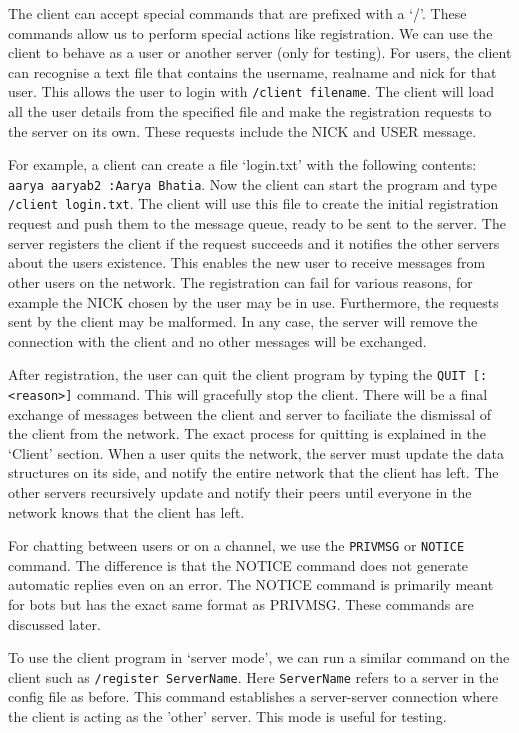\documentclass[letterpaper,twocolumn,10pt]{article}
\begin{document}
The client can accept special commands that are prefixed with a `/'. These
commands allow us to perform special actions like registration. We can use the
client to behave as a user or another server (only for testing). For users, the
client can recognise a text file that contains the username, realname and nick
for that user. This allows the user to login with \verb|/client filename|. The
client will load all the user details from the specified file and make the
registration requests to the server on its own. These requests include the NICK
and USER message.

For example, a client can create a file `login.txt' with the following
contents: \verb|aarya aaryab2 :Aarya Bhatia|. Now the client can start the
program and type \verb|/client login.txt|. The client will use this file to
create the initial registration request and push them to the message queue,
ready to be sent to the server. The server registers the client if the request
succeeds and it notifies the other servers about the users existence. This
enables the new user to receive messages from other users on the network. The
registration can fail for various reasons, for example the NICK chosen by the
user may be in use. Furthermore, the requests sent by the client may be
malformed. In any case, the server will remove the connection with the client
and no other messages will be exchanged.

After registration, the user can quit the client program by typing the
\verb|QUIT [:<reason>]| command. This will gracefully stop the client. There
will be a final exchange of messages between the client and server to faciliate
the dismissal of the client from the network. The exact process for quitting is
explained in the `Client' section. When a user quits the network, the server must update the data structures on
its side, and notify the entire network that the client has left. The other
servers recursively update and notify their peers until everyone in the network knows
that the client has left.

For chatting between users or on a channel, we use the \verb|PRIVMSG| or \verb|NOTICE| command.
The difference is that the NOTICE command does not generate automatic replies even on an error.
The NOTICE command is primarily meant for bots but has the exact same format as PRIVMSG. These commands
are discussed later.

To use the client program in `server mode', we can run a similar command on the client such
as \verb|/register ServerName|. Here \verb|ServerName| refers to a server in the
config file as before. This command establishes a server-server connection where the client is acting as the 'other' server.
This mode is useful for testing.
\end{document}
